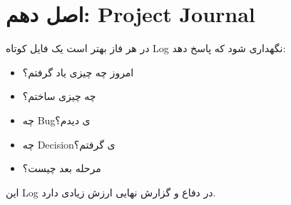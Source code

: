 \section{اصل دهم: Project Journal}

در هر فاز بهتر است یک فایل کوتاه Log نگهداری شود که پاسخ دهد:
\begin{itemize}
  \item امروز چه چیزی یاد گرفتم؟
  \item چه چیزی ساختم؟
  \item چه Bugی دیدم؟
  \item چه Decisionی گرفتم؟
  \item مرحله بعد چیست؟
\end{itemize}

این Log در دفاع و گزارش نهایی ارزش زیادی دارد.
